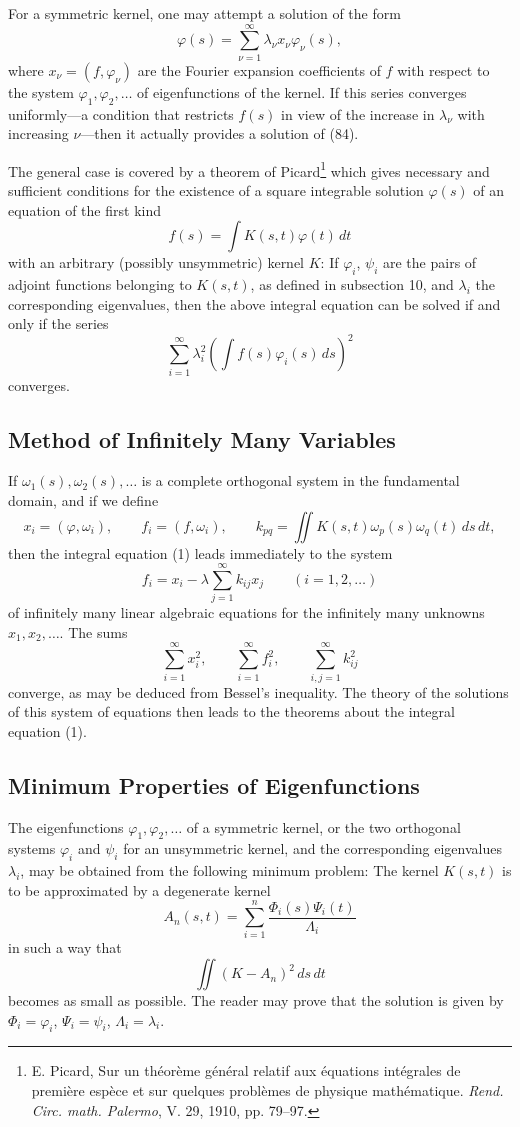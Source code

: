 For a symmetric kernel, one may attempt a solution of the form
\[
\varphi(s)=\sum_{\nu=1}^{\infty}\lambda_\nu x_\nu\varphi_\nu(s),
\]
where $x_\nu=(f,\varphi_\nu)$ are the Fourier expansion coefficients of $f$ with respect to the system $\varphi_1,\varphi_2,\ldots$ of eigenfunctions of the kernel. If this series converges uniformly---a condition that restricts $f(s)$ in view of the increase in $\lambda_\nu$ with increasing $\nu$---then it actually provides a solution of (84).

The general case is covered by a theorem of Picard\footnote{E. Picard, Sur un th\'eor\`eme g\'en\'eral relatif aux \'equations int\'egrales de premi\`ere esp\`ece et sur quelques probl\`emes de physique math\'ematique. \emph{Rend. Circ. math. Palermo}, V. 29, 1910, pp. 79--97.} which gives necessary and sufficient conditions for the existence of a square integrable solution $\varphi(s)$ of an equation of the first kind
\[
f(s)=\int K(s,t)\varphi(t)\,dt
\]
with an arbitrary (possibly unsymmetric) kernel $K$: If $\varphi_i$, $\psi_i$ are the pairs of adjoint functions belonging to $K(s,t)$, as defined in subsection 10, and $\lambda_i$ the corresponding eigenvalues, then the above integral equation can be solved if and only if the series
\[
\sum_{i=1}^{\infty}\lambda_i^2\left(\int f(s)\varphi_i(s)\,ds\right)^2
\]
converges.

\subsection{Method of Infinitely Many Variables}
If $\omega_1(s),\omega_2(s),\ldots$ is a complete orthogonal system in the fundamental domain, and if we define
\[
x_i=(\varphi,\omega_i),\qquad f_i=(f,\omega_i),\qquad
k_{pq}=\iint K(s,t)\omega_p(s)\omega_q(t)\,ds\,dt,
\]
then the integral equation (1) leads immediately to the system
\[
f_i=x_i-\lambda\sum_{j=1}^{\infty}k_{ij}x_j
\qquad (i=1,2,\ldots)
\]
of infinitely many linear algebraic equations for the infinitely many unknowns $x_1,x_2,\ldots$. The sums
\[
\sum_{i=1}^{\infty}x_i^2,\qquad
\sum_{i=1}^{\infty}f_i^2,\qquad
\sum_{i,j=1}^{\infty}k_{ij}^2
\]
converge, as may be deduced from Bessel's inequality. The theory of the solutions of this system of equations then leads to the theorems about the integral equation (1).

\subsection{Minimum Properties of Eigenfunctions}
The eigenfunctions $\varphi_1,\varphi_2,\ldots$ of a symmetric kernel, or the two orthogonal systems $\varphi_i$ and $\psi_i$ for an unsymmetric kernel, and the corresponding eigenvalues $\lambda_i$, may be obtained from the following minimum problem: The kernel $K(s,t)$ is to be approximated by a degenerate kernel
\[
A_n(s,t)=\sum_{i=1}^{n}\frac{\Phi_i(s)\Psi_i(t)}{\Lambda_i}
\]
in such a way that
\[
\iint (K-A_n)^2\,ds\,dt
\]
becomes as small as possible. The reader may prove that the solution is given by $\Phi_i=\varphi_i$, $\Psi_i=\psi_i$, $\Lambda_i=\lambda_i$.

